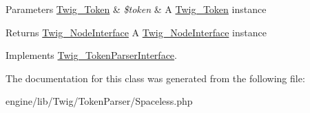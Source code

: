 \begin{DoxyParams}[1]{Parameters}
\hyperlink{class_twig___token}{Twig\+\_\+\+Token} & {\em \$token} & A \hyperlink{class_twig___token}{Twig\+\_\+\+Token} instance\\
\hline
\end{DoxyParams}
\begin{DoxyReturn}{Returns}
\hyperlink{interface_twig___node_interface}{Twig\+\_\+\+Node\+Interface} A \hyperlink{interface_twig___node_interface}{Twig\+\_\+\+Node\+Interface} instance 
\end{DoxyReturn}


Implements \hyperlink{interface_twig___token_parser_interface_a5dfa2e269321584fb74e8b43dabe0efd}{Twig\+\_\+\+Token\+Parser\+Interface}.



The documentation for this class was generated from the following file\+:\begin{DoxyCompactItemize}
\item 
engine/lib/\+Twig/\+Token\+Parser/Spaceless.\+php\end{DoxyCompactItemize}
